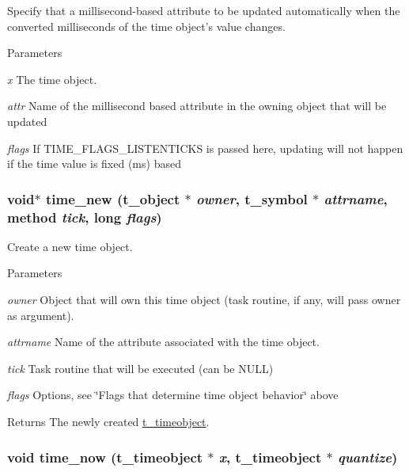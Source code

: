 Specify that a millisecond-\/based attribute to be updated automatically when the converted milliseconds of the time object's value changes. 
\begin{DoxyParams}{Parameters}
\item[{\em x}]The time object. \item[{\em attr}]Name of the millisecond based attribute in the owning object that will be updated \item[{\em flags}]If TIME\_\-FLAGS\_\-LISTENTICKS is passed here, updating will not happen if the time value is fixed (ms) based \end{DoxyParams}
\hypertarget{group__time_gaf6153d8f28738932c0ea3906a6c51696}{
\subsubsection[{time\_\-new}]{\setlength{\rightskip}{0pt plus 5cm}void$\ast$ time\_\-new ({\bf t\_\-object} $\ast$ {\em owner}, \/  {\bf t\_\-symbol} $\ast$ {\em attrname}, \/  {\bf method} {\em tick}, \/  long {\em flags})}}
\label{group__time_gaf6153d8f28738932c0ea3906a6c51696}


Create a new time object. 
\begin{DoxyParams}{Parameters}
\item[{\em owner}]Object that will own this time object (task routine, if any, will pass owner as argument). \item[{\em attrname}]Name of the attribute associated with the time object. \item[{\em tick}]Task routine that will be executed (can be NULL) \item[{\em flags}]Options, see \char`\"{}Flags that determine time object behavior\char`\"{} above \end{DoxyParams}
\begin{DoxyReturn}{Returns}
The newly created \hyperlink{group__time_gab568d2ffd4d84ca17c0b90cf2f7c6a40}{t\_\-timeobject}. 
\end{DoxyReturn}
\hypertarget{group__time_ga75b99466073d15d4096fb34a5b172648}{
\subsubsection[{time\_\-now}]{\setlength{\rightskip}{0pt plus 5cm}void time\_\-now ({\bf t\_\-timeobject} $\ast$ {\em x}, \/  {\bf t\_\-timeobject} $\ast$ {\em quantize})}}
\label{group__time_ga75b99466073d15d4096fb34a5b172648}


